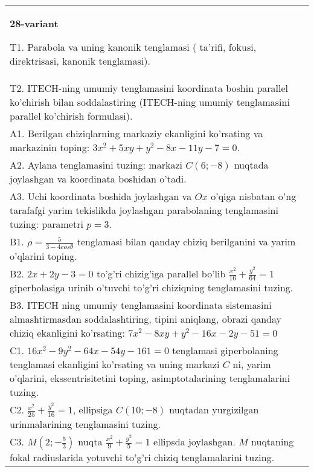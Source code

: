 \documentclass{article}
\begin{document}
\begin{tabular}{m{17cm}}
\textbf{28-variant}
\newline

T1. Parabola va uning kanonik tenglamasi ( ta'rifi, fokusi, direktrisasi, kanonik tenglamasi).\\

T2. ITECH-ning umumiy tenglamasini koordinata boshin parallel ko'chirish bilan soddalastiring (ITECH-ning umumiy tenglamasini parallel ko'chirish formulasi).\\

A1. Berilgan chiziqlarning markaziy ekanligini ko'rsating va markazinin toping: $3x^{2}+5xy+y^{2}-8x-11y-7=0$.\\

A2. Aylana tenglamasini tuzing: markazi $C(6;-8)$ nuqtada joylashgan va koordinata boshidan o'tadi.\\

A3. Uchi koordinata boshida joylashgan va $Ox$ o'qiga nisbatan o'ng tarafafgi yarim tekislikda joylashgan parabolaning tenglamasini tuzing: parametri $p=3$.\\

B1. $\rho = \frac{5}{3 - 4cos\theta}$ tenglamasi bilan qanday chiziq berilganini va yarim o'qlarini toping.  \\

B2. $2x + 2y - 3 = 0$ to'g'ri chizig'iga parallel bo'lib $\frac{x^{2}}{16} + \frac{y^{2}}{64} = 1$ giperbolasiga urinib o'tuvchi to'g'ri chiziqning tenglamasini tuzing.  \\

B3. ITECH ning umumiy tenglamasini koordinata sistemasini almashtirmasdan soddalashtiring, tipini aniqlang, obrazi qanday chiziq ekanligini ko'rsating: $7x^{2} - 8xy + y^{2} - 16x - 2y - 51 = 0$\\

C1. $16x^{2} - 9y^{2} - 64x - 54y - 161 = 0$ tenglamasi giperbolaning tenglamasi ekanligini ko'rsating va uning markazi $C$ ni, yarim o'qlarini, ekssentrisitetini toping, asimptotalarining tenglamalarini tuzing.  \\

C2. $\frac{x^{2}}{25} + \frac{y^{2}}{16} = 1$, ellipsiga $C(10; - 8)$ nuqtadan yurgizilgan urinmalarining tenglamasini tuzing.  \\

C3. $M(2; - \frac{5}{3})$ nuqta $\frac{x^{2}}{9} + \frac{y^{2}}{5} = 1$ ellipsda joylashgan. $M$ nuqtaning fokal radiuslarida yotuvchi to'g'ri chiziq tenglamalarini tuzing.  \\

\end{tabular}
\vspace{1cm}
\end{document}

